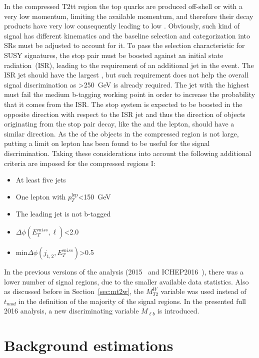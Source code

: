 In the compressed T2tt region the top quarks are produced off-shell or with a very low momentum, limiting the available momentum,  and therefore their decay products have very low \pt consequently leading to  low \MET. Obviously, such kind of signal has different kinematics and the baseline selection and categorization into SRs must be adjusted to account for it. To pass the \MET selection characteristic for SUSY signatures, the stop pair must be boosted against an initial state radiation~(ISR), leading to the requirement of  an additional jet in the event. The ISR jet should have the largest \pt, but such requirement does not help the overall signal discrimination as \MET>250~GeV is already required. The jet with the highest \pt must fail the medium b-tagging working point in order to increase the probability that it comes from the ISR. The stop system is expected to be boosted in the opposite direction with respect to the ISR jet and thus the direction of objects originating from the stop pair decay, like the \MET and the lepton, should have a similar direction. As the \pt of the objects in the compressed region is not large, putting a limit on lepton \pt has been found to be useful for the signal discrimination. Taking these considerations into account the following additional criteria are imposed for the compressed regions I: 

\begin{itemize}
\item At least five jets
\item One lepton with $p_{T}^{\mathrm{lep}}$<150~GeV
\item The leading jet is not b-tagged
\item $\Delta \phi(E_{T}^{miss}, \ell)$<2.0 
\item min$\Delta \phi (j_{1,2}, E_{T}^{miss})$>0.5
\end{itemize}

In the previous versions of the analysis (2015~\cite{Sirunyan:2016jpr} and ICHEP2016~\cite{CMS:2016vew}), there was a lower number of signal regions, due to the smaller available data statistics. Also as discussed before in Section~\ref{sec:mt2w}, the $M_{T2}^{W}$ variable was used instead of $t_{mod}$ in the definition of the majority of the signal regions. In the presented full 2016 analysis, a new discriminating variable $M_{\ell b}$ is introduced. %


\section{Background estimations~\label{sec:estimations}}

